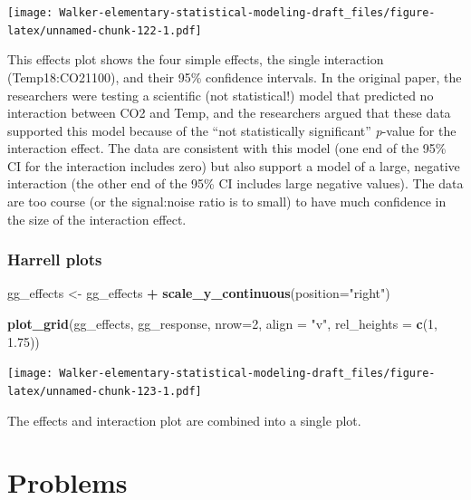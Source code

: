 \documentclass[]{book}
\newenvironment{Shaded}{\begin{snugshade}}{\end{snugshade}}
\newcommand{\DataTypeTok}[1]{\textcolor[rgb]{0.13,0.29,0.53}{#1}}
\newcommand{\DecValTok}[1]{\textcolor[rgb]{0.00,0.00,0.81}{#1}}
\newcommand{\FloatTok}[1]{\textcolor[rgb]{0.00,0.00,0.81}{#1}}
\newcommand{\KeywordTok}[1]{\textcolor[rgb]{0.13,0.29,0.53}{\textbf{#1}}}
\newcommand{\NormalTok}[1]{#1}
\newcommand{\OperatorTok}[1]{\textcolor[rgb]{0.81,0.36,0.00}{\textbf{#1}}}
\newcommand{\StringTok}[1]{\textcolor[rgb]{0.31,0.60,0.02}{#1}}
\begin{document}
\texttt{[image: Walker-elementary-statistical-modeling-draft\_files/figure-latex/unnamed-chunk-122-1.pdf]}

This effects plot shows the four simple effects, the single interaction (Temp18:CO21100), and their 95\% confidence intervals. In the original paper, the researchers were testing a scientific (not statistical!) model that predicted no interaction between CO2 and Temp, and the researchers argued that these data supported this model because of the ``not statistically significant'' \emph{p}-value for the interaction effect. The data are consistent with this model (one end of the 95\% CI for the interaction includes zero) but also support a model of a large, negative interaction (the other end of the 95\% CI includes large negative values). The data are too course (or the signal:noise ratio is to small) to have much confidence in the size of the interaction effect.

\hypertarget{harrell-plots}{%
\subsubsection{Harrell plots}\label{harrell-plots}}

\begin{Shaded}
\begin{Highlighting}[]
\NormalTok{gg_effects <-}\StringTok{ }\NormalTok{gg_effects }\OperatorTok{+}\StringTok{ }\KeywordTok{scale_y_continuous}\NormalTok{(}\DataTypeTok{position=}\StringTok{"right"}\NormalTok{)}

\KeywordTok{plot_grid}\NormalTok{(gg_effects, gg_response, }\DataTypeTok{nrow=}\DecValTok{2}\NormalTok{, }
          \DataTypeTok{align =} \StringTok{"v"}\NormalTok{, }
          \DataTypeTok{rel_heights =} \KeywordTok{c}\NormalTok{(}\DecValTok{1}\NormalTok{, }\FloatTok{1.75}\NormalTok{))}
\end{Highlighting}
\end{Shaded}

\texttt{[image: Walker-elementary-statistical-modeling-draft\_files/figure-latex/unnamed-chunk-123-1.pdf]}

The effects and interaction plot are combined into a single plot.

\hypertarget{problems-1}{%
\section{Problems}\label{problems-1}}
\end{document}

